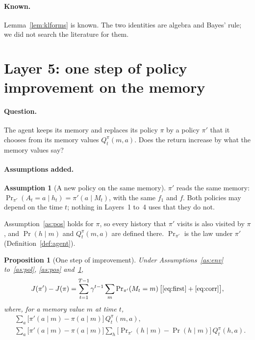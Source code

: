 \documentclass{article}
\newtheorem{proposition}{Proposition}[section]
\theoremstyle{definition}
\newtheorem{assumption}{Assumption}
\numberwithin{equation}{section}
\newcommand{\Prn}{\Pr\nolimits_{\pi'}}
\begin{document}
\paragraph{Known.} Lemma~\ref{lem:klforms} is known. The two identities are algebra and Bayes' rule; we did not search the literature for them.

\section{Layer 5: one step of policy improvement on the memory}\label{sec:layer5}

\paragraph{Question.} The agent keeps its memory and replaces its policy $\pi$ by a policy $\pi'$ that it chooses from its memory values $Q^\pi_t(m,a)$. Does the return increase by what the memory values say?

\paragraph{Assumptions added.}
\begin{assumption}[A new policy on the same memory]\label{as:new}
$\pi'$ reads the same memory: $\Prn(A_t=a\mid h_t)=\pi'(a\mid M_t)$, with the same $f_1$ and $f$. Both policies may depend on the time $t$; nothing in Layers~1 to~4 uses that they do not.
\end{assumption}
Assumption~\ref{as:pos} holds for $\pi$, so every history that $\pi'$ visits is also visited by $\pi$, and $\Pr(h\mid m)$ and $Q^\pi_t(m,a)$ are defined there. $\Prn$ is the law under $\pi'$ (Definition~\ref{def:agent}).

\begin{proposition}[One step of improvement]\label{prop:improve}
Under Assumptions~\ref{as:env} to~\ref{as:pol}, \ref{as:pos} and~\ref{as:new},
\[
J(\pi')-J(\pi)=\sum_{t=1}^{T-1}\gamma^{t-1}\sum_m\Prn(M_t=m)\,\big[\eqref{eq:first}+\eqref{eq:corr}\big],
\]
where, for a memory value $m$ at time $t$,
\begin{align}
&\sum_a\big[\pi'(a\mid m)-\pi(a\mid m)\big]\,Q^\pi_t(m,a), \label{eq:first}\\
&\sum_a\big[\pi'(a\mid m)-\pi(a\mid m)\big]\sum_h\big[\Prn(h\mid m)-\Pr(h\mid m)\big]\,Q^\pi_t(h,a). \label{eq:corr}
\end{align}
\end{proposition}
\end{document}
